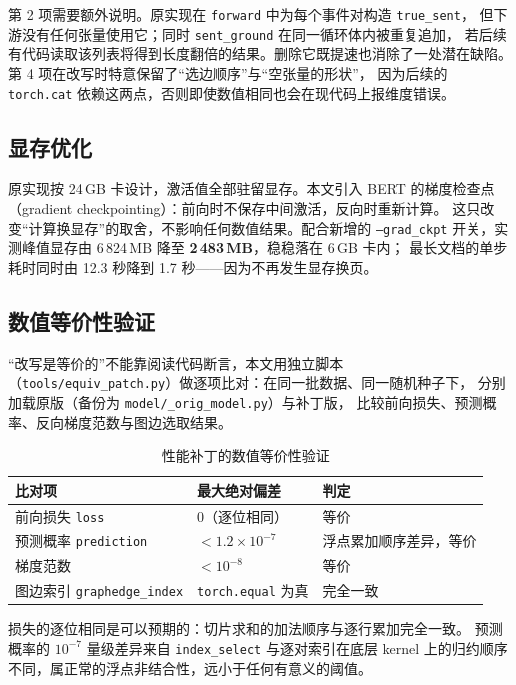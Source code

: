 第 2 项需要额外说明。原实现在 \texttt{forward} 中为每个事件对构造 \texttt{true\_sent}，
但下游没有任何张量使用它；同时 \texttt{sent\_ground} 在同一循环体内被重复追加，
若后续有代码读取该列表将得到长度翻倍的结果。删除它既提速也消除了一处潜在缺陷。
第 4 项在改写时特意保留了“选边顺序”与“空张量的形状”，
因为后续的 \texttt{torch.cat} 依赖这两点，否则即使数值相同也会在现代码上报维度错误。

\subsection{显存优化}

原实现按 24\,GB 卡设计，激活值全部驻留显存。本文引入 BERT 的梯度检查点
（gradient checkpointing）：前向时不保存中间激活，反向时重新计算。
这只改变“计算换显存”的取舍，不影响任何数值结果。配合新增的 \texttt{--grad\_ckpt}
开关，实测峰值显存由 6\,824\,MB 降至 \textbf{2\,483\,MB}，稳稳落在 6\,GB 卡内；
最长文档的单步耗时同时由 12.3 秒降到 1.7 秒——因为不再发生显存换页。

\subsection{数值等价性验证}

“改写是等价的”不能靠阅读代码断言，本文用独立脚本
（\texttt{tools/equiv\_patch.py}）做逐项比对：在同一批数据、同一随机种子下，
分别加载原版（备份为 \texttt{model/}\allowbreak\texttt{\_orig\_model.py}）与补丁版，
比较前向损失、预测概率、反向梯度范数与图边选取结果。

\begin{table}[H]
\centering
\caption{性能补丁的数值等价性验证}
\label{tab:equiv}
\small
\begin{tabular}{lll}
\toprule
比对项 & 最大绝对偏差 & 判定\\
\midrule
前向损失 \texttt{loss} & $0$（逐位相同） & 等价\\
预测概率 \texttt{prediction} & $<1.2\times10^{-7}$ & 浮点累加顺序差异，等价\\
梯度范数 & $<10^{-8}$ & 等价\\
图边索引 \texttt{graphedge\_index} & \texttt{torch.equal} 为真 & 完全一致\\
\bottomrule
\end{tabular}
\end{table}

损失的逐位相同是可以预期的：切片求和的加法顺序与逐行累加完全一致。
预测概率的 $10^{-7}$ 量级差异来自 \texttt{index\_select} 与逐对索引在底层
kernel 上的归约顺序不同，属正常的浮点非结合性，远小于任何有意义的阈值。

